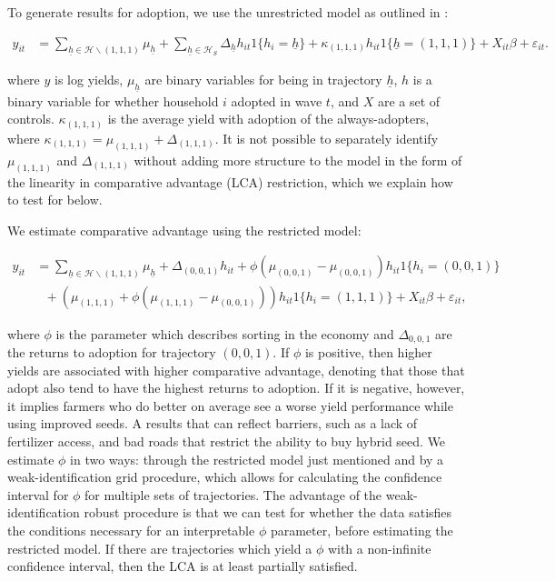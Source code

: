 \documentclass[11pt]{article}
\begin{document}
To generate results for adoption, we use the unrestricted model as outlined in \cite{Tjernstrom_Emilia_Dalia_Ghanem_Oscar_Barriga_Cabanillas_Travis_J_Lybbert_Jeffrey_D_Michler_and_Aleksandr_Michuda2020-bc}:

\begin{align}
y_{it}&=\sum_{\underline{h}\in\mathcal{H}\backslash (1,1,1)}\mu_{\underline{h}}+\sum_{\underline{h}\in\mathcal{H}_{S}}\Delta_{\underline{h}}h_{it}1\{h_{i}=\underline{h}\} + \kappa_{(1,1,1)}h_{it}1\{\underline{h}=(1,1,1)\}+ X_{it}\beta+\varepsilon_{it}.\label{eq:GRC}
\end{align}

where $y$ is log yields, $\mu_{\underline{h}}$ are binary variables for being in trajectory $\underline{h}$, $h$ is a binary variable for whether household $i$ adopted in wave $t$, and $X$ are a set of controls. $\kappa_{(1,1,1)}$ is the average yield with adoption of the always-adopters, where $\kappa_{(1,1,1)} = \mu_{(1,1,1)} + \Delta_{(1,1,1)}$. It is not possible to separately identify $\mu_{(1,1,1)}$ and $\Delta_{(1,1,1)}$ without adding more structure to the model in the form of the linearity in comparative advantage (LCA) restriction, which we explain how to test for below.

We estimate comparative advantage using the restricted model:

\begin{align}
y_{it}&=\sum_{\underline{h}\in\mathcal{H}\backslash (1,1,1)}\mu_{\underline{h}}+\Delta_{(0,0,1)}h_{it}+\phi(\mu_{(0,0,1)}-\mu_{(0,0,1)})h_{it}1\{h_{i}=(0,0,1)\}\nonumber\\
&~~~+\left(\mu_{(1,1,1)}+\phi\left(\mu_{(1,1,1)}-\mu_{(0,0,1)}\right)\right)h_{it}1\{h_{i}=(1,1,1)\} + X_{it}\beta +\varepsilon_{it},\label{eq:GRC_Suri}
\end{align}

where $\phi$ is the parameter which describes sorting in the economy and $\Delta_{0,0,1}$ are the returns to adoption for trajectory $(0,0,1)$. If $\phi$ is positive, then higher yields are associated with higher comparative advantage, denoting that those that adopt also tend to have the highest returns to adoption. If it is negative, however, it implies farmers who do better on average see a worse yield performance while using improved seeds. A results that can reflect  barriers, such as a lack of fertilizer access, and bad roads that restrict the ability to buy hybrid seed. We estimate $\phi$ in two ways: through the restricted model just mentioned and by a weak-identification grid procedure, which allows for calculating the confidence interval for $\phi$ for multiple sets of trajectories. The advantage of the weak-identification robust procedure is that we can test for whether the data satisfies the conditions necessary for an interpretable $\phi$ parameter, before estimating the restricted model. If there are trajectories which yield a $\phi$ with a non-infinite confidence interval, then the LCA is at least partially satisfied.
\end{document}
